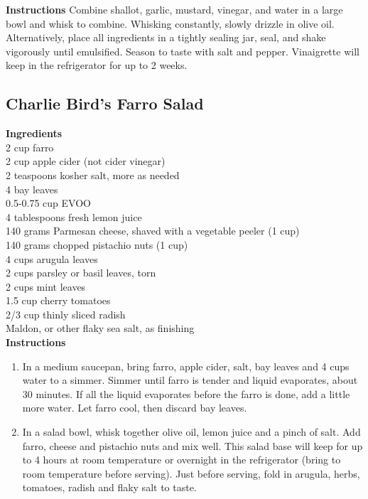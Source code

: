 \documentclass{article}
\numberwithin{figure}{section}
\numberwithin{equation}{section}
\begin{document}
{\bf Instructions}
Combine shallot, garlic, mustard, vinegar, and water in a large bowl and whisk to combine. Whisking constantly, slowly drizzle in olive oil. Alternatively, place all ingredients in a tightly sealing jar, seal, and shake vigorously until emulsified. Season to taste with salt and pepper. Vinaigrette will keep in the refrigerator for up to 2 weeks.

\pagebreak
\subsection{Charlie Bird's Farro Salad}

{\bf Ingredients}\\
2 cup farro\\
2 cup apple cider (not cider vinegar)\\
2 teaspoons kosher salt, more as needed\\
4 bay leaves\\
0.5-0.75 cup EVOO\\
4 tablespoons fresh lemon juice\\
140 grams Parmesan cheese, shaved with a vegetable peeler (1 cup)\\
140 grams chopped pistachio nuts (1 cup)\\
4 cups arugula leaves\\
2 cups parsley or basil leaves, torn\\
2 cups mint leaves\\
1.5 cup cherry tomatoes\\
2/3 cup thinly sliced radish\\
Maldon, or other flaky sea salt, as finishing\\

{\bf Instructions}
\begin{enumerate}
\item In a medium saucepan, bring farro, apple cider, salt, bay leaves and 4 cups water to a simmer. Simmer until farro is tender and liquid evaporates, about 30 minutes. If all the liquid evaporates before the farro is done, add a little more water. Let farro cool, then discard bay leaves.
\item In a salad bowl, whisk together olive oil, lemon juice and a pinch of salt. Add farro, cheese and pistachio nuts and mix well. This salad base will keep for up to 4 hours at room temperature or overnight in the refrigerator (bring to room temperature before serving). Just before serving, fold in arugula, herbs, tomatoes, radish and flaky salt to taste.
\end{enumerate}
\end{document}
